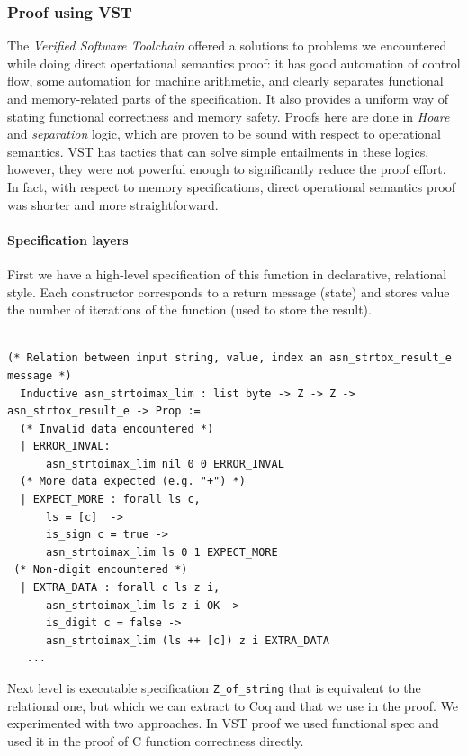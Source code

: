 \documentclass[acmsmall,nonacm]{acmart}
\begin{document}
\subsubsection{Proof using VST}

The \textit{Verified Software Toolchain}\cite{VST} offered a
solutions to problems we encountered while doing direct opertational
semantics proof: it has good automation of control flow, some
automation for machine arithmetic, and clearly separates functional
and memory-related parts of the specification. It also provides a
uniform way of stating functional correctness and memory
safety. Proofs here are done in \textit{Hoare} and \textit{separation}
logic, which are proven to be sound with respect to operational
semantics. VST has tactics that can solve simple entailments in these
logics, however, they were not powerful enough to significantly reduce
the proof effort. In fact, with respect to memory specifications,
direct operational semantics proof was shorter and more
straightforward.

\paragraph{Specification layers} First we have a high-level specification of this function in declarative, relational style. Each constructor corresponds to a return message (state) and stores value the number of iterations of the function (used to store the result).

 \begin{lstlisting}[language=Coq]

(* Relation between input string, value, index an asn_strtox_result_e message *)
  Inductive asn_strtoimax_lim : list byte -> Z -> Z -> asn_strtox_result_e -> Prop :=
  (* Invalid data encountered *)
  | ERROR_INVAL:
      asn_strtoimax_lim nil 0 0 ERROR_INVAL
  (* More data expected (e.g. "+") *)
  | EXPECT_MORE : forall ls c,
      ls = [c]  ->
      is_sign c = true ->
      asn_strtoimax_lim ls 0 1 EXPECT_MORE
 (* Non-digit encountered *)
  | EXTRA_DATA : forall c ls z i,
      asn_strtoimax_lim ls z i OK ->
      is_digit c = false -> 
      asn_strtoimax_lim (ls ++ [c]) z i EXTRA_DATA
   ...    
  \end{lstlisting}

Next level is executable specification \texttt{Z\_of\_string} that is equivalent to the relational one, but which we can extract to Coq and that we use in the proof. We experimented with two approaches. In VST proof we used functional spec and used it in the proof of C function correctness directly.
\end{document}
